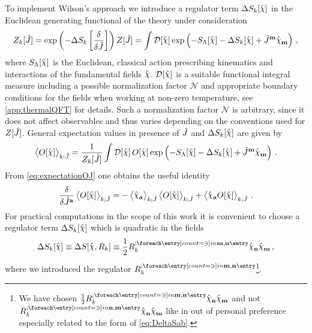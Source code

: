 To implement Wilson's \rg{} approach we introduce a \rgscaledependent{} regulator term $\Delta S_k[\FSf{\FSsf}]$ in the Euclidean generating functional of the theory under consideration
\begin{align}
	Z_k[\FSf{J}]=\exp\del[3]{-\Delta S_k\sbr{\frac{\delta}{\delta \FSf{J}}}}Z[\FSf{J}]= \int \mathcal{D}[\FSff{\FSsf}] \exp\del{-\Sinit[\FSff{\FSsf}]-\Delta S_k[ \FSf{\FSsf}]+\FSfu{J}{m}\FSfd{\FSsf}{m}}\,,
	\label{eq:ZkDef}
\end{align}
where $\Sinit[\FSff{\FSsf}]$ is the Euclidean, classical action prescribing kinematics and interactions of the fundamental fields $\FSff{\FSsf}$. 
$\mathcal{D}[\FSff{\FSsf}]$ is a suitable functional integral measure including a possible normalization factor $\mathcal{N}$ and appropriate boundary conditions for the fields when working at non-zero temperature, see \cref{app:thermalQFT} for details.
Such a normalization factor $\mathcal{N}$ is arbitrary, since it does not affect observables and thus varies depending on the conventions used for $Z[\hat{J}]$.
General expectation values in presence of $\hat{J}$ and $\Delta S_k[\FSf{\FSsf}]$  are given by
\begin{align}
	\expectationValue{O[\FSf{\FSsf}]}{\FSf{J}} =\frac{1}{Z_k[\FSf{J}]}  \int \mathcal{D}[\FSff{\FSsf}]\, O[\FSf{\FSsf}] \exp\del{-\Sinit[\FSff{\FSsf}]-\Delta S_k[ \FSf{\FSsf}]+\FSfu{J}{m}\FSfd{\FSsf}{m}}
	\label{eq:expectationOJ}\,.
\end{align}
From \cref{eq:expectationOJ} one obtains the useful identity
\begin{align}
	\frac{\delta}{\delta \FSfu{J}{a}}\expectationValue{O[\FSf{\FSsf}]}{\FSf{J}} = -\expectationValue{\FSfd{\FSsf}{a}}{\FSf{J}}\expectationValue{O[\FSf{\FSsf}]}{\FSf{J}} + \expectationValue{\FSfd{\FSsf}{a}O[\FSf{\FSsf}]}{\FSf{J}}
	\label{eq:dexpectationOJdJ}\,.
\end{align}
For practical computations in the scope of this work it is convenient to choose a regulator term $\Delta S_k[ \FSf{\FSsf}]$ which  is quadratic in the fields
\begin{align}
	\Delta S_k[ \FSf{\FSsf}] 
	\equiv  \Delta S[ \FSf{\FSsf},R_k]
	\equiv \frac{1}{2} \FSregulator{\FSidx{m},\FSidx{n}}\FSfd{\FSsf}{n}\FSfd{\FSsf}{m}\,,\label{eq:DeltaSRab}
\end{align}
where we introduced the regulator $\FSregulator{\FSidx{m},\FSidx{n}}$\footnote{%
	We have chosen $\frac{1}{2} \FSregulator{\FSidx{m},\FSidx{n}}\FSfd{\FSsf}{n}\FSfd{\FSsf}{m}$ and not $\FSregulator{\FSidx{n},\FSidx{m}}\FSfd{\FSsf}{n}\FSfd{\FSsf}{m}$ like in  out of personal preference especially related to the form of \cref{eq:DeltaSab}.%
}.
